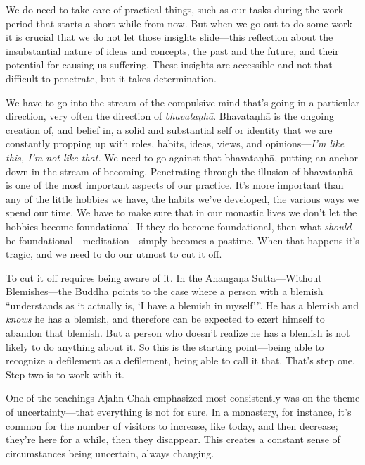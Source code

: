 We do need to take care of practical things, such as our tasks during 
the work period that starts a short while from now. But when we go out 
to do some work it is crucial that we do not let those insights 
slide---this reflection about the insubstantial nature of ideas and 
concepts, the past and the future, and their potential for causing us 
suffering. These insights are accessible and not that difficult to 
penetrate, but it takes determination.

We have to go into the stream of the compulsive mind that's going in a 
particular direction, very often the direction of \emph{bhavataṇhā}. 
Bhavataṇhā is the ongoing creation of, and belief in, a solid and 
substantial self or identity that we are constantly propping up with 
roles, habits, ideas, views, and opinions---\emph{I'm like this, I'm 
not like that.} We need to go against that bhavataṇhā, putting an 
anchor down in the stream of becoming. Penetrating through the illusion 
of bhavataṇhā is one of the most important aspects of our practice. 
It's more important than any of the little hobbies we have, the habits 
we've developed, the various ways we spend our time. We have to make 
sure that in our monastic lives we don't let the hobbies become 
foundational. If they do become foundational, then what \emph{should} 
be foundational---meditation---simply becomes a pastime. When that 
happens it's tragic, and we need to do our utmost to cut it off.

To cut it off requires being aware of it. In the Anangaṇa 
Sutta---Without Blemishes---the Buddha points to the case where a 
person with a blemish ``understands as it actually is, `I have a 
blemish in myself'\thinspace''. He has a blemish and \emph{knows} he 
has a blemish, and therefore can be expected to exert himself to 
abandon that blemish. But a person who doesn't realize he has a blemish 
is not likely to do anything about it. So this is the starting 
point---being able to recognize a defilement as a defilement, being 
able to call it that. That's step one. Step two is to work with it.


One of the teachings Ajahn Chah emphasized most consistently was on the 
theme of uncertainty---that everything is not for sure. In a monastery, 
for instance, it's common for the number of visitors to increase, like 
today, and then decrease; they're here for a while, then they 
disappear. This creates a constant sense of circumstances being 
uncertain, always changing.

